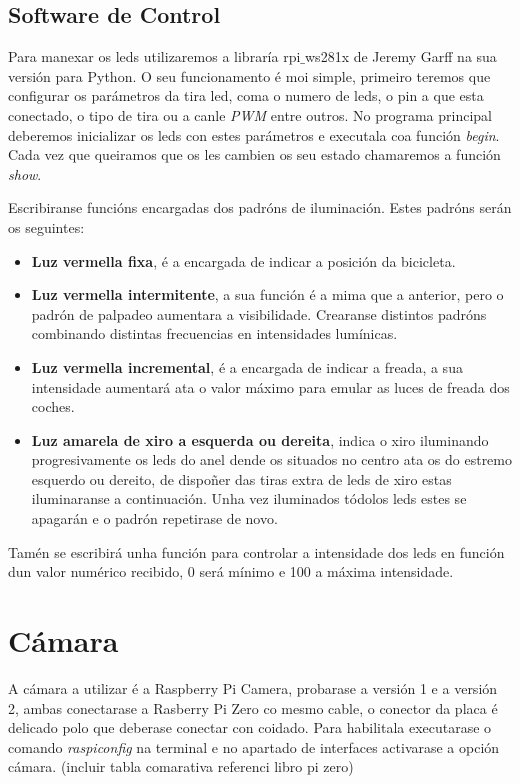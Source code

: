 \subsection{Software de Control}
Para manexar os leds utilizaremos a libraría rpi\(\_\)ws281x de Jeremy Garff na sua versión para Python. O seu funcionamento é moi simple, primeiro teremos que configurar os parámetros da tira led, coma o numero de leds, o pin a que esta conectado, o tipo de tira  ou a canle \emph{PWM} entre outros. No programa principal deberemos inicializar os leds con estes parámetros e executala coa función \emph{begin}. Cada vez que queiramos que os les cambien os seu estado chamaremos a función \emph{show}.

Escribiranse funcións encargadas dos padróns de iluminación. Estes padróns serán os seguintes:
\begin{itemize}
    \item \textbf{Luz vermella fixa},
    é a encargada de indicar a posición da bicicleta.
    \item \textbf{Luz vermella intermitente},
    a sua función é a mima que a anterior, pero o padrón de palpadeo aumentara a visibilidade. Crearanse distintos padróns combinando distintas frecuencias en intensidades lumínicas.
    \item \textbf{Luz vermella incremental},
    é a encargada de indicar a freada, a sua intensidade aumentará ata o valor máximo para emular as luces de freada dos coches.
    \item \textbf{Luz amarela de xiro a esquerda ou dereita},
    indica o xiro iluminando progresivamente os leds do anel dende os situados no centro ata os do estremo esquerdo ou dereito, de dispoñer das tiras extra de leds de xiro estas iluminaranse a continuación. Unha vez iluminados tódolos leds estes se apagarán e o padrón repetirase de novo.
\end{itemize}

Tamén se escribirá unha función para controlar a intensidade dos leds en función dun valor numérico recibido, 0 será mínimo e 100 a máxima intensidade.

\section{Cámara}

A cámara a utilizar é a Raspberry Pi Camera, probarase a versión 1 e a versión 2, ambas conectarase a Rasberry Pi Zero co mesmo cable, o conector da placa é delicado polo que deberase conectar con coidado. Para habilitala executarase o comando \emph{raspiconfig} na terminal e no apartado de interfaces activarase a opción cámara. (incluir tabla comarativa referenci libro pi zero)

